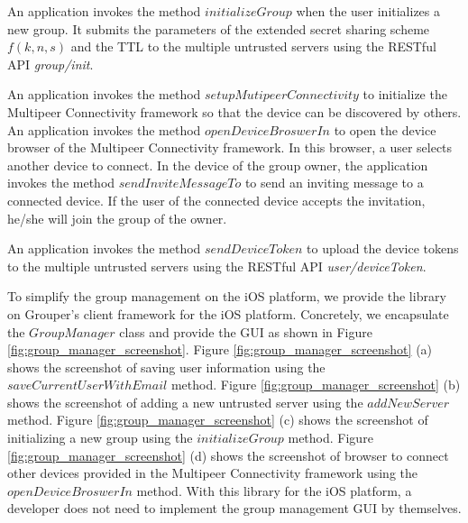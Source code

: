 \documentclass[a4paper,11pt]{report}
\begin{document}
An application invokes the method $initializeGroup$  when the user initializes a new group.
It submits the parameters of the extended secret sharing scheme $f(k, n, s)$ and the TTL to the multiple untrusted servers using the RESTful API \emph{group/init}.

An application invokes the method $setupMutipeerConnectivity$ to initialize the Multipeer Connectivity framework so that the device can be discovered by others.
An application invokes the method $openDeviceBroswerIn$ to open the device browser of the Multipeer Connectivity framework.
In this browser, a user selects another device to connect.
In the device of the group owner, the application invokes the method $sendInviteMessageTo$ to send an inviting message to a connected device.
If the user of the connected device accepts the invitation, he/she will join the group of the owner.

An application invokes the method $sendDeviceToken$ to upload the device tokens to the multiple untrusted servers using the RESTful API \emph{user/deviceToken}.

To simplify the group management on the iOS platform, we provide the library on Grouper's client framework for the iOS platform.
Concretely, we encapsulate the $GroupManager$ class and provide the GUI as shown in Figure \ref{fig:group_manager_screenshot}.
Figure \ref{fig:group_manager_screenshot} (a) shows the screenshot of saving user information using the  $saveCurrentUserWithEmail$ method.
Figure \ref{fig:group_manager_screenshot} (b) shows the screenshot of adding a new untrusted server using the  $addNewServer$ method.
Figure \ref{fig:group_manager_screenshot} (c) shows the screenshot of initializing a new group using the  $initializeGroup$ method.
Figure \ref{fig:group_manager_screenshot} (d) shows the screenshot of browser to connect other devices provided in the Multipeer Connectivity framework using the $openDeviceBroswerIn$ method.
With this library for the iOS platform, a developer does not need to implement the group management GUI by themselves.
\end{document}
